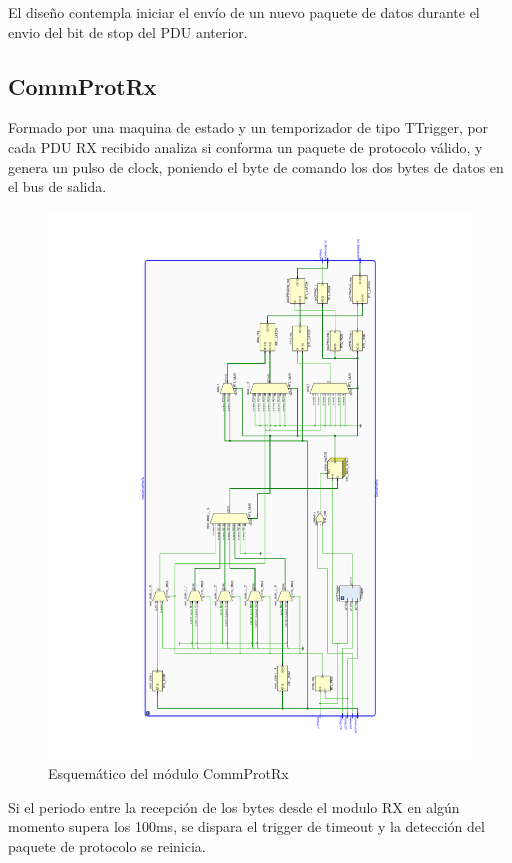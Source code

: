 \documentclass[12pt]{article}
\begin{document}
El diseño contempla iniciar el envío de un nuevo paquete de datos durante el envio del bit de stop del PDU anterior.

\subsection{CommProtRx}
Formado por una maquina de estado y un temporizador de tipo TTrigger, por cada PDU RX recibido analiza si conforma un paquete de protocolo válido, y genera un pulso de clock, poniendo el byte de comando los dos bytes de datos en el bus de salida.

\begin{figure}[H]
    \centering
    \includegraphics[angle=270, width=\textwidth]{CommProtRx}
    \caption{Esquemático del módulo CommProtRx}
\end{figure}

Si el periodo entre la recepción de los bytes desde el modulo RX en algún momento supera los 100ms, se dispara el trigger de timeout y la detección del paquete de protocolo se reinicia.
\end{document}
